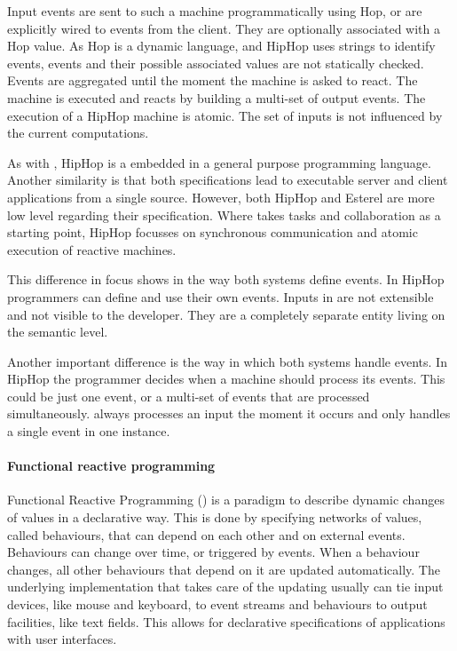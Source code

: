Input events are sent to such a machine programmatically using Hop, or are explicitly wired to events from the client.
They are optionally associated with a Hop value.
As Hop is a dynamic language, and HipHop uses strings to identify events, events and their possible associated values are not statically checked.
Events are aggregated until the moment the machine is asked to react.
The machine is executed and reacts by building a multi-set of output events.
The execution of a HipHop machine is atomic.
The set of inputs is not influenced by the current computations.

As with \TOPHAT, HipHop is a \DSL embedded in a general purpose programming language.
Another similarity is that both specifications lead to executable server and client applications from a single source.
However, both HipHop and Esterel are more low level regarding their specification.
Where \TOPHAT takes tasks and collaboration as a starting point,
HipHop focusses on synchronous communication and atomic execution of reactive machines.

This difference in focus shows in the way both systems define events.
In HipHop programmers can define and use their own events.
Inputs in \TOPHAT are not extensible and not visible to the developer.
They are a completely separate entity living on the semantic level.

Another important difference is the way in which both systems handle events.
In HipHop the programmer decides when a machine should process its events.
This could be just one event, or a multi-set of events that are processed simultaneously.
\TOPHAT always processes an input the moment it occurs and only handles a single event in one instance.



\paragraph{Functional reactive programming}

Functional Reactive Programming (\FRP) is a paradigm to describe dynamic changes of values in a declarative way.
This is done by specifying networks of values, called behaviours, that can depend on each other and on external events.
Behaviours can change over time, or triggered by events.
When a behaviour changes, all other behaviours that depend on it are updated automatically.
The underlying implementation that takes care of the updating usually can tie input devices, like mouse and keyboard, to event streams and behaviours to output facilities, like text fields.
This allows for declarative specifications of applications with user interfaces.

